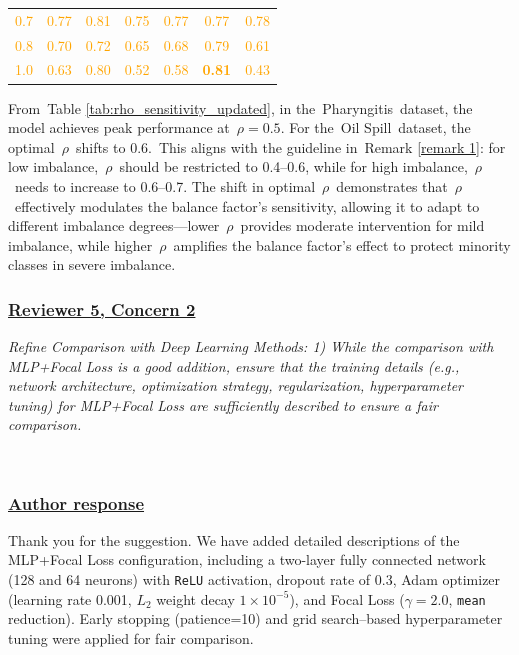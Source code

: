 \documentclass[journal,12pn, onecolumn]{IEEEtran}
\begin{document}
{{{{{{{\begin{table}[h]
\begin{tabular}{c c c c c c c}
\textcolor{orange}{0.7}    & \textcolor{orange}{0.77}     & \textcolor{orange}{0.81}               & \textcolor{orange}{0.75}            & \textcolor{orange}{0.77}     & \textcolor{orange}{0.77}               & \textcolor{orange}{0.78}            \\
\textcolor{orange}{0.8}    & \textcolor{orange}{0.70}     & \textcolor{orange}{0.72}               & \textcolor{orange}{0.65}            & \textcolor{orange}{0.68}     & \textcolor{orange}{0.79}               & \textcolor{orange}{0.61}            \\
\textcolor{orange}{1.0}    & \textcolor{orange}{0.63}     & \textcolor{orange}{0.80}               & \textcolor{orange}{0.52}            & \textcolor{orange}{0.58}     &\textcolor{orange}{\textbf{0.81}}              & \textcolor{orange}{0.43}            \\
\bottomrule
\end{tabular}
\end{table}

From Table \ref{tab:rho_sensitivity_updated}, in the Pharyngitis dataset, the model achieves peak performance at \(\rho=0.5\). For the Oil Spill dataset, the optimal \(\rho\) shifts to 0.6. This aligns with the guideline in Remark \ref{remark 1}: for low imbalance, \(\rho\) should be restricted to 0.4–0.6, while for high imbalance, \(\rho\) needs to increase to 0.6–0.7. The shift in optimal \(\rho\) demonstrates that \(\rho\) effectively modulates the balance factor’s sensitivity, allowing it to adapt to different imbalance degrees—lower \(\rho\) provides moderate intervention for mild imbalance, while higher \(\rho\) amplifies the balance factor’s effect to protect minority classes in severe imbalance.
}




\textcolor{customgreen}{
\subsubsection*{\underline{\textbf{Reviewer 5, Concern 2}}}
\emph{Refine Comparison with Deep Learning Methods:
1) While the comparison with MLP+Focal Loss is a good addition, ensure that the training details (e.g., network architecture, optimization strategy, regularization, hyperparameter tuning) for MLP+Focal Loss are sufficiently described to ensure a fair comparison.}
}\\

{\color{black}
\subsubsection*{\textbf{\underline{Author response}}}
Thank you for the suggestion. We have added detailed descriptions of the MLP+Focal Loss configuration, including a two-layer fully connected network (128 and 64 neurons) with \texttt{ReLU} activation, dropout rate of 0.3, Adam optimizer (learning rate 0.001, $L_2$ weight decay $1\times10^{-5}$), and Focal Loss ($\gamma=2.0$, \texttt{mean} reduction). Early stopping (patience=10) and grid search–based hyperparameter tuning were applied for fair comparison.
}\\

}}}}}}
\end{document}
